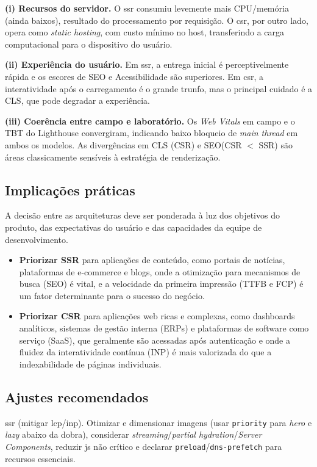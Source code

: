 {\textbf{(i) Recursos do servidor.} O \acrshort{ssr} consumiu levemente mais CPU/memória (ainda baixos), resultado do processamento por requisição. O \acrshort{csr}, por outro lado, opera como \emph{static hosting}, com custo mínimo no host, transferindo a carga computacional para o dispositivo do usuário.

\textbf{(ii) Experiência do usuário.} Em \acrshort{ssr}, a entrega inicial é perceptivelmente rápida e os escores de SEO e Acessibilidade são superiores. Em \acrshort{csr}, a interatividade após o carregamento é o grande trunfo, mas o principal cuidado é a CLS, que pode degradar a experiência.

\textbf{(iii) Coerência entre campo e laboratório.} Os \textit{Web Vitals} em campo e o TBT do Lighthouse convergiram, indicando baixo bloqueio de \emph{main thread} em ambos os modelos. As divergências em CLS (CSR) e SEO(CSR $<$ SSR) são áreas classicamente sensíveis à estratégia de renderização.

\subsection{Implicações práticas}
A decisão entre as arquiteturas deve ser ponderada à luz dos objetivos do produto, das expectativas do usuário e das capacidades da equipe de desenvolvimento.
\begin{itemize}
    \item \textbf{Priorizar SSR} para aplicações de conteúdo, como portais de notícias, plataformas de e-commerce e blogs, onde a otimização para mecanismos de busca (SEO) é vital, e a velocidade da primeira impressão (TTFB e FCP) é um fator determinante para o sucesso do negócio.
    \item \textbf{Priorizar CSR} para aplicações web ricas e complexas, como dashboards analíticos, sistemas de gestão interna (ERPs) e plataformas de software como serviço (SaaS), que geralmente são acessadas após autenticação e onde a fluidez da interatividade contínua (INP) é mais valorizada do que a indexabilidade de páginas individuais.
\end{itemize}

\subsection{Ajustes recomendados}

\acrfull{ssr} (mitigar \acrshort{lcp}/\acrshort{inp}). Otimizar e dimensionar imagens (usar \texttt{priority} para \emph{hero} e \emph{lazy} abaixo da dobra), considerar \emph{streaming}/\emph{partial hydration}/\emph{Server Components}, reduzir \acrshort{js} não crítico e declarar \texttt{preload}/\texttt{dns-prefetch} para recursos essenciais. \\

}
